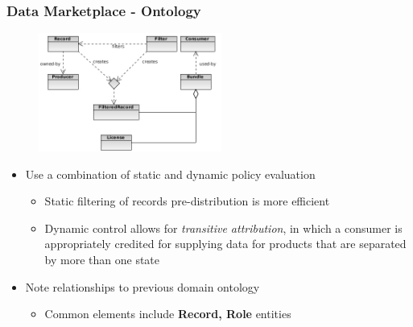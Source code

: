 \documentclass[t, 10pt]{beamer}
\begin{document}
\begin{frame}
\frametitle{Data Marketplace - Ontology}
\pause

\begin{figure}
\includegraphics[width = 6cm]{ontology}
\end{figure}
\pause

\begin{itemize}
\item Use a combination of static and dynamic policy evaluation
\begin{itemize}
\item Static filtering of records pre-distribution is more efficient
\item Dynamic control allows for \textit{transitive attribution}, in which a consumer is appropriately credited for supplying data for products that are separated by more than one state
\end{itemize}
\pause

\item Note relationships to previous domain ontology
\begin{itemize}
\item Common elements include \textbf{Record, Role} entities
\end{itemize}
\end{itemize}

\end{frame}
\end{document}

